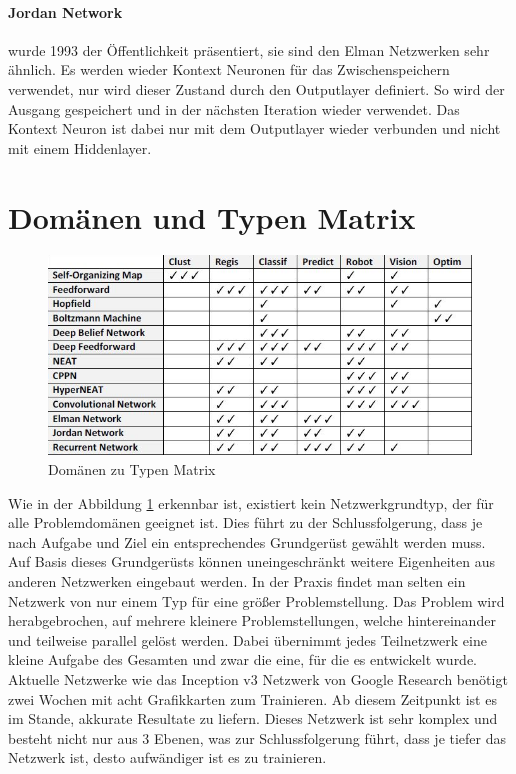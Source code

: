 \paragraph{Jordan Network} wurde 1993 der Öffentlichkeit präsentiert, sie sind den Elman Netzwerken sehr ähnlich. 
Es werden wieder Kontext Neuronen für das Zwischenspeichern verwendet, nur wird dieser Zustand durch den Outputlayer definiert.
So wird der Ausgang gespeichert und in der nächsten Iteration wieder verwendet.
Das Kontext Neuron ist dabei nur mit dem Outputlayer wieder verbunden und nicht mit einem Hiddenlayer.

\section{Domänen und Typen Matrix}

\begin{figure}
	\includegraphics[scale=0.68]{images/typen_domains.png}
	\caption{Domänen zu Typen Matrix \cite{AI3}}
	\label{fig:DomainMatrix}
\end{figure}

Wie in der Abbildung \ref{fig:DomainMatrix} erkennbar ist, existiert kein Netzwerkgrundtyp, der für alle Problemdomänen geeignet ist.
Dies führt zu der Schlussfolgerung, dass je nach Aufgabe und Ziel ein entsprechendes Grundgerüst gewählt werden muss. 
Auf Basis dieses Grundgerüsts können uneingeschränkt weitere Eigenheiten aus anderen Netzwerken eingebaut werden.
In der Praxis findet man selten ein Netzwerk von nur einem Typ für eine größer Problemstellung. 
Das Problem wird herabgebrochen, auf mehrere kleinere Problemstellungen, welche hintereinander und teilweise parallel gelöst werden.
Dabei übernimmt jedes Teilnetzwerk eine kleine Aufgabe des Gesamten und zwar die eine, für die es entwickelt wurde. 
Aktuelle Netzwerke wie das Inception v3 Netzwerk von Google Research benötigt zwei Wochen mit acht Grafikkarten zum Trainieren. 
Ab diesem Zeitpunkt ist es im Stande, akkurate Resultate zu liefern. 
Dieses Netzwerk ist sehr komplex und besteht nicht nur aus 3 Ebenen, was zur Schlussfolgerung führt, dass je tiefer das Netzwerk ist, desto aufwändiger ist es zu trainieren.

